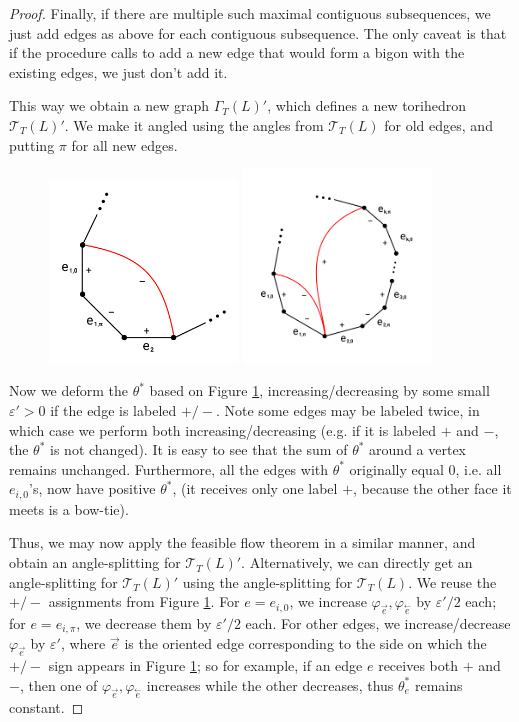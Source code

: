\documentclass[11pt]{amsart}
\newcommand{\figref}[1]{Figure \ref{#1}}
\newcommand{\sT}{{\mathcal{T}}}
\newcommand{\cev}[1]{\overset{\leftarrow}{#1}}
\newcommand{\vphi}{\varphi}
\newcommand{\veps}{\varepsilon}
\theoremstyle{plain}
\theoremstyle{definition}
\begin{document}
\begin{proof}
Finally, if there are multiple such maximal contiguous subsequences,
we just add edges as above for each contiguous subsequence.
The only caveat is that if the procedure calls to add a new edge
that would form a bigon with the existing edges,
we just don't add it.


This way we obtain a new graph $\Gamma_T(L)'$, which defines a
new torihedron $\sT_T(L)'$.
We make it angled using the angles from $\sT_T(L)$ for old edges,
and putting $\pi$ for all new edges.


\begin{figure}
\label{f:adding_edges}
\includegraphics[width=5cm]{more_pictures/one_edge.png}
\includegraphics[width=5cm]{more_pictures/two_edge_many.png}
\end{figure}

Now we deform the $\theta^*$ based on \figref{f:adding_edges},
increasing/decreasing by some small $\veps' > 0$ if the edge
is labeled $+/-$.
Note some edges may be labeled twice, in which case we perform
both increasing/decreasing (e.g. if it is labeled $+$ and $-$,
the $\theta^*$ is not changed).
It is easy to see that the sum of $\theta^*$ around a vertex
remains unchanged.
Furthermore, all the edges with $\theta^*$ originally equal 0,
i.e. all $e_{i,0}$'s,
now have positive $\theta^*$,
(it receives only one label $+$,
because the other face it meets is a bow-tie).


Thus, we may now apply the feasible flow theorem in a similar manner,
and obtain an angle-splitting for $\sT_T(L)'$.
Alternatively, we can directly get an angle-splitting for $\sT_T(L)'$
using the angle-splitting for $\sT_T(L)$.
We reuse the $+/-$ assignments from \figref{f:adding_edges}.
For $e = e_{i,0}$, we increase $\vphi_{\vec{e}}, \vphi_{\cev{e}}$
by $\veps'/2$ each; for $e = e_{i,\pi}$,
we decrease them by $\veps'/2$ each.
For other edges, we increase/decrease $\vphi_{\vec{e}}$ by $\veps'$,
where $\vec{e}$ is the oriented edge corresponding to the side
on which the $+/-$ sign appears in \figref{f:adding_edges};
so for example, if an edge $e$ receives both $+$ and $-$,
then one of $\vphi_{\vec{e}},\vphi_{\cev{e}}$ increases
while the other decreases, thus $\theta_e^*$ remains constant.



\end{proof}
\end{document}
